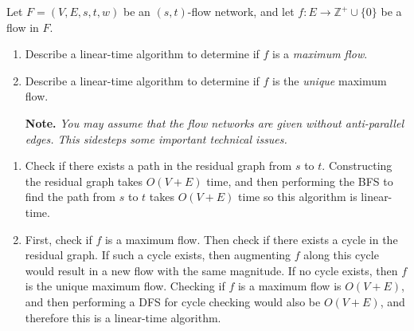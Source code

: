 \documentclass{article}
\begin{document}
\begin{question}
Let $F = (V, E, s, t, w)$ be an $(s, t)$-flow network, and let $f : E \to \mathbb Z^+ \cup \{0\}$ be a flow in $F$.

\begin{enumerate}[label = (\alph*)]
    \item Describe a linear-time algorithm to determine if $f$ is a {\em maximum flow}.
    \item Describe a linear-time algorithm to determine if $f$ is the {\em unique} maximum flow.

    {\bfseries Note.} {\em You may assume that the flow networks are given without anti-parallel edges. This sidesteps some important technical issues.}
\end{enumerate}
\end{question}

\begin{solution}
\begin{enumerate}[label = (\alph*)]
    \item Check if there exists a path in the residual graph from $s$ to $t$.
    Constructing the residual graph takes $O(V + E)$ time, and then performing the BFS 
    to find the path from $s$ to $t$ takes $O(V+E)$ time so this algorithm is linear-time.

    \item First, check if $f$ is a maximum flow. 
    Then check if there exists a cycle in the residual graph.
    If such a cycle exists, then augmenting $f$ along this cycle would result 
    in a new flow with the same magnitude. If no cycle exists, then $f$ is the unique maximum flow.
    Checking if $f$ is a maximum flow is $O(V+E)$, and then performing a DFS 
    for cycle checking would also be $O(V+E)$, and therefore this is a linear-time algorithm.

\end{enumerate}
\end{solution}
\end{document}
